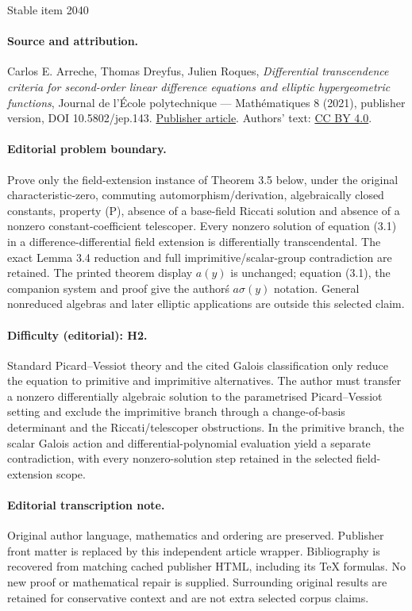 \documentclass[11pt]{article}
\numberwithin{equation}{section}\providecommand{\loccit}{\textit{loc.\ cit.}}
\theoremstyle{definition}
\begin{document}
\begin{center}{\Large Stable item 2040}\end{center}
\paragraph{Source and attribution.}
Carlos E. Arreche, Thomas Dreyfus, Julien Roques, \emph{Differential transcendence criteria for second-order linear difference equations and elliptic hypergeometric functions}, Journal de l’École polytechnique — Mathématiques 8 (2021), publisher version, DOI 10.5802/jep.143. \href{https://jep.centre-mersenne.org/articles/10.5802/jep.143/}{Publisher article}. Authors' text: \href{https://creativecommons.org/licenses/by/4.0/}{CC BY 4.0}.
\paragraph{Editorial problem boundary.}
Prove only the field-extension instance of Theorem 3.5 below, under the original characteristic-zero, commuting automorphism/derivation, algebraically closed constants, property (P), absence of a base-field Riccati solution and absence of a nonzero constant-coefficient telescoper. Every nonzero solution of equation (3.1) in a difference-differential field extension is differentially transcendental. The exact Lemma 3.4 reduction and full imprimitive/scalar-group contradiction are retained. The printed theorem display \(a(y)\) is unchanged; equation (3.1), the companion system and proof give the author\'s \(a\sigma(y)\) notation. General nonreduced algebras and later elliptic applications are outside this selected claim.
\paragraph{Difficulty (editorial): H2.}
Standard Picard--Vessiot theory and the cited Galois classification only reduce the equation to primitive and imprimitive alternatives. The author must transfer a nonzero differentially algebraic solution to the parametrised Picard--Vessiot setting and exclude the imprimitive branch through a change-of-basis determinant and the Riccati/telescoper obstructions. In the primitive branch, the scalar Galois action and differential-polynomial evaluation yield a separate contradiction, with every nonzero-solution step retained in the selected field-extension scope.
\paragraph{Editorial transcription note.}
Original author language, mathematics and ordering are preserved. Publisher front matter is replaced by this independent article wrapper. Bibliography is recovered from matching cached publisher HTML, including its TeX formulas. No new proof or mathematical repair is supplied. Surrounding original results are retained for conservative context and are not extra selected corpus claims.
\clearpage
\end{document}
